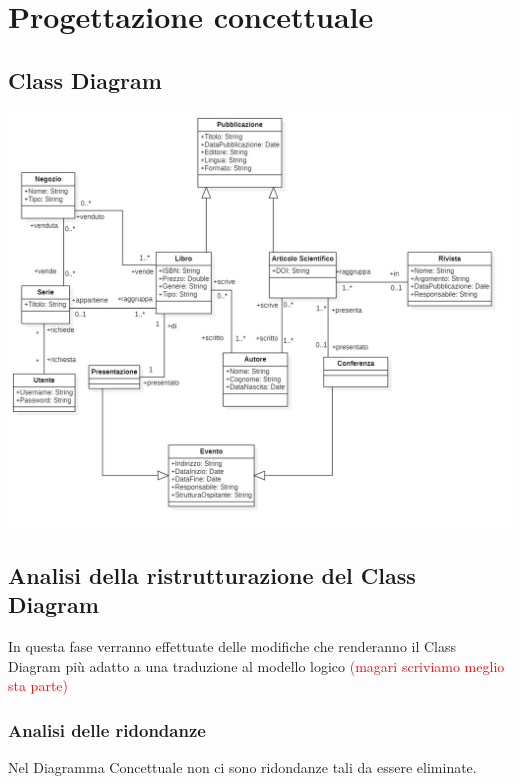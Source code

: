 \chapter{Progettazione concettuale}
    \section{Class Diagram}

    \includegraphics[scale=0.3]{Immagini/SchemaConcettuale.png}
        
    \section{Analisi della ristrutturazione del Class Diagram}
        In questa fase verranno effettuate delle modifiche che renderanno il Class Diagram
        più adatto a una traduzione al modello logico \textcolor{red}{(magari scriviamo meglio sta parte)}
        \subsection{Analisi delle ridondanze}
        Nel Diagramma Concettuale non ci sono ridondanze tali da essere eliminate.
